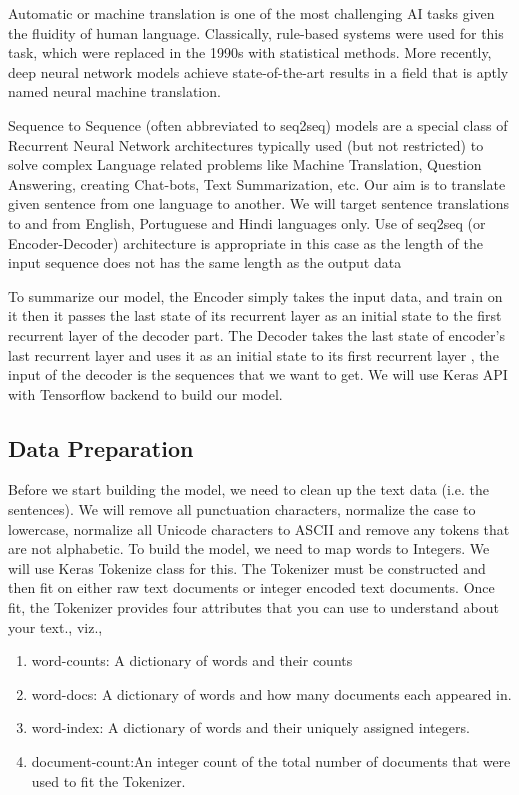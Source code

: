 \documentclass[runningheads]{llncs}
\begin{document}
	Automatic or machine translation is one of the most challenging AI tasks given the fluidity of human language. Classically, rule-based systems were used for this task, which were replaced in the 1990s with statistical methods. More recently, deep neural network models achieve state-of-the-art results in a field that is aptly named neural machine translation. 
	
	Sequence to Sequence (often abbreviated to seq2seq) models are a special class of Recurrent Neural Network architectures typically used (but not restricted) to solve complex Language related problems like Machine Translation, Question Answering, creating Chat-bots, Text Summarization, etc. Our aim is to translate given sentence from one language to another. We will target sentence translations to and from English, Portuguese and  Hindi languages only. Use of seq2seq (or Encoder-Decoder) architecture is appropriate in this case as the length of the input sequence  does not has the same length as the output data
	
	To summarize our model, the Encoder simply takes the input data, and train on it then it passes the last state of its recurrent layer as an initial state to the first recurrent layer of the decoder part. The Decoder takes the last state of encoder’s last recurrent layer and uses it as an initial state to its first recurrent layer , the input of the decoder is the sequences that we want to get. We will use Keras API with Tensorflow backend to build our model.


	\subsection{Data Preparation}
	Before we start building the model, we need to clean up the text data (i.e. the sentences). We will remove all punctuation characters, normalize the case to lowercase, normalize all Unicode characters to ASCII and remove any tokens that are not alphabetic. To build the model, we need to map words to Integers. We will use Keras Tokenize class for this. The Tokenizer must be constructed and then fit on either raw text documents or integer encoded text documents. Once fit, the Tokenizer provides four attributes that you can use to understand about your text., viz.,
					\begin{enumerate}
						 \item word-counts: A dictionary of words and their counts
						 \item word-docs: A dictionary of words and how many documents each appeared in.
						\item word-index: A dictionary of words and their uniquely assigned integers.
						\item document-count:An integer count of the total number of documents that were used to fit the Tokenizer.
					\end{enumerate}
	
\end{document}

